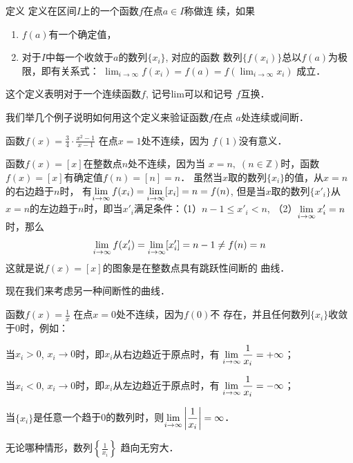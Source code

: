 \begin{blk}{定义}
     定义在区间$I$上的一个函数$f$在点$a\in I$称做连
续，如果
\begin{enumerate}
\item $f(a)$有一个确定值，
\item 对于$I$中每一个收敛于$a$的数列$\{x_i\}$, 对应的函数
数列$\{f(x_i)\}$总以$f(a)$为极限，即有关系式：
$\displaystyle\lim_{i\to \infty}f(x_i)=f(a)=f\left(\displaystyle\lim_{i\to \infty}x_i\right)$
成立．
\end{enumerate}
\end{blk}


这个定义表明对于一个连续函数$f$, 记号lim可以和记号
$f$互换．

我们举几个例子说明如何用这个定义来验证函数$f$在点
$a$处连续或间断．


\begin{example}
    函数$f(x)=\frac{3}{4}\cdot\frac{x^2-1}{x-1}$
在点$x=1$处不连续，因为
$f(1)$没有意义．
\end{example}

\begin{example}
    函数$f(x)=[x]$在整数点$n$处不连续，因为当
$x=n,\; (n\in\mathbb{Z})$时，函数$f(x)=[x]$有确定值$f(n)=[n]=n$．
虽然当$x$取的数列$\{x_i\}$的值，从$x=n$的右边趋于$n$时，
有$\displaystyle\lim_{i\to\infty}f(x_i)=\displaystyle\lim_{i\to\infty}[x_i]=n=f(n)$, 但是当$x$取的数列$\{x'_i\}$从$x=n$的左边趋于$n$时，即当$x'_i$满足条件：（1）$n-1\le x'_i <n$, （2）$\displaystyle\lim_{i\to \infty}x'_i=n$时，那么
\[\displaystyle\lim_{i\to \infty}f(x'_i)=\displaystyle\lim_{i\to \infty}[x'_i]=n-1\ne f(n)=n\]
这就是说$f(x)=[x]$的图象是在整数点具有跳跃性间断的
曲线．
\end{example}

现在我们来考虑另一种间断性的曲线．
\begin{example}
    函数$f(x)=\frac{1}{x}$
    在点$x=0$处不连续，因为$f(0)$不
    存在，并且任何数列$\{x_i\}$收敛于0时，例如：
    
    当$x_i>0$, $x_i\to 0$时，即$x_i$从右边趋近于原点时，有
$\displaystyle\lim_{i\to\infty}\dfrac{1}{x_i}=+\infty$；

    当$x_i<0$, $x_i\to 0$时，即$x_i$从左边趋近于原点时，有
    $\displaystyle\lim_{i\to\infty}\dfrac{1}{x_i}=-\infty$；

    当$\{x_i\}$是任意一个趋于0的数列时，则$\displaystyle\lim_{i\to\infty}\left|\dfrac{1}{x_i}\right|=\infty$．

    无论哪种情形，数列$\left\{\frac{1}{x_i}\right\}$
    趋向无穷大．
\end{example}

